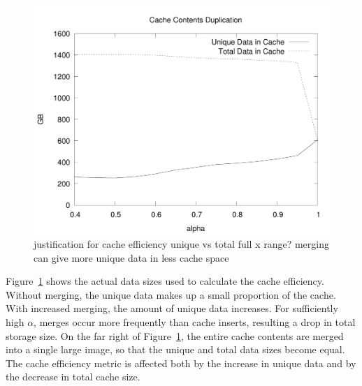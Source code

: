 \documentclass[sigconf]{acmart}
\begin{document}
\begin{figure}
\includegraphics[width=\linewidth]{curated/comparative/cache_efficiency.pdf}
\label{fig:cache-eff}
justification for cache efficiency
unique vs total
full x range?
merging can give more unique data in less cache space
\end{figure}

Figure~\ref{fig:cache-eff} shows the actual data sizes used to calculate the cache efficiency.
Without merging, the unique data makes up a small proportion of the cache.
With increased merging, the amount of unique data increases.
For sufficiently high $\alpha$,
merges occur more frequently than cache inserts,
resulting a drop in total storage size.
On the far right of Figure~\ref{fig:cache-eff},
the entire cache contents are merged into a single large image,
so that the unique and total data sizes become equal.
The cache efficiency metric is affected both by the increase in unique data and by the decrease in total cache size.
\end{document}

